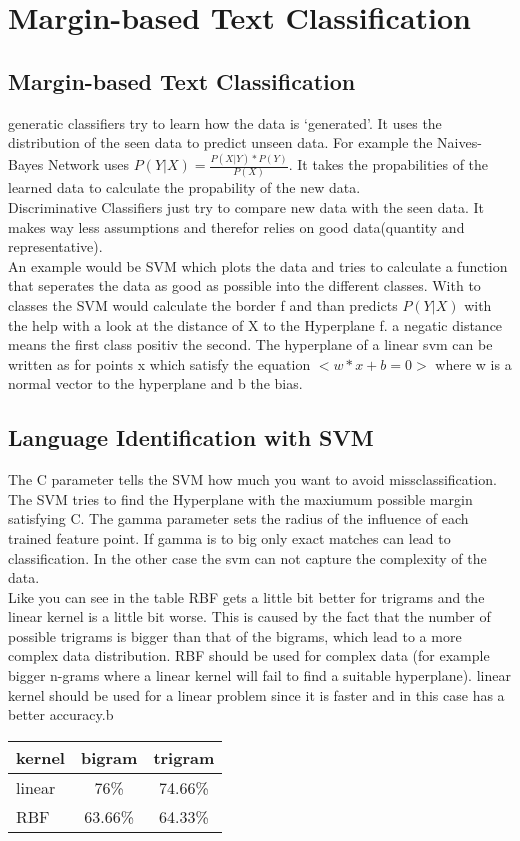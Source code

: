 \documentclass{article}
\begin{document}
\section{Margin-based Text Classification}
\subsection{Margin-based Text Classification}
generatic classifiers try to learn how the data is `generated'. It uses the distribution of the seen data to predict unseen data. For example the Naives-Bayes Network uses $P(Y|X) = \frac{P(X|Y)*P(Y)}{P(X)}$. It takes the propabilities of the learned data to calculate the propability of the new data.\\
Discriminative Classifiers just try to compare new data with the seen data. It makes way less assumptions and therefor relies on good data(quantity and representative).\\ An example would be SVM which plots the data and tries to calculate a function that seperates the data as good as possible into the different classes. With to classes the SVM would calculate the border f and than predicts $P(Y|X)$ with the help with a look at the distance of X to the Hyperplane f. a negatic distance means the first class positiv the second. The hyperplane of a linear svm can be written as for points x which satisfy the equation  $<w*x+b=0>$ where w is a normal vector to the hyperplane and b the bias.

\subsection{Language Identification with SVM}
The C parameter tells the SVM how much you want to avoid missclassification. The SVM tries to find the Hyperplane with the maxiumum possible margin satisfying C. The gamma parameter sets the radius of the influence of each trained feature point. If gamma is to big only exact matches can lead to classification. In the other case the svm can not capture the complexity of the data.\\
Like you can see in the table RBF gets a little bit better for trigrams and the linear kernel is a little bit worse. This is caused by the fact that the number of possible trigrams is bigger than that of the bigrams, which lead to a more complex data distribution. RBF should be used for complex data (for example bigger n-grams where a linear kernel will fail to find a suitable hyperplane). linear kernel should be used for a linear problem since it is faster and in this case has a better accuracy.b
\begin{table}[H]
\begin{tabular}{l|c|c}
kernel&bigram&trigram\\\hline
linear&76\%&74.66\%\\\hline
RBF&63.66\%&64.33\%\\
\end{tabular}
\end{table}
\end{document}
